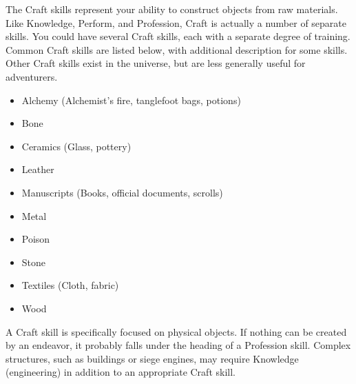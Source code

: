 \newpage
{}
    The Craft skills represent your ability to construct objects from raw materials.
    Like Knowledge, Perform, and Profession, Craft is actually a number of separate skills.
    You could have several Craft skills, each with a separate degree of training.
    Common Craft skills are listed below, with additional description for some skills.
    Other Craft skills exist in the universe, but are less generally useful for adventurers.

    \begin{itemize}
        \item Alchemy (Alchemist's fire, tanglefoot bags, potions)
        \item Bone
        \item Ceramics (Glass, pottery)
        \item Leather
        \item Manuscripts (Books, official documents, scrolls)
        \item Metal
        \item Poison
        \item Stone
        \item Textiles (Cloth, fabric)
        \item Wood
    \end{itemize}

    A Craft skill is specifically focused on physical objects. If nothing can be created by an endeavor, it probably falls under the heading of a Profession skill. Complex structures, such as buildings or siege engines, may require Knowledge (engineering) in addition to an appropriate Craft skill.

